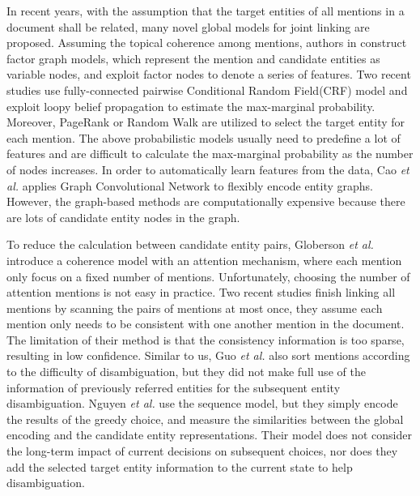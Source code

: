 \documentclass[sigconf]{acmart}
\begin{document}
In recent years, with the assumption that the target entities of all mentions in a document shall be related, many novel global models for joint linking are proposed. Assuming the topical coherence among mentions, authors in \cite{GaneaGLEH16, RanSW18} construct factor graph models, which represent the mention and candidate entities as variable nodes, and exploit factor nodes to denote a series of features. Two recent studies \cite{GaneaH17, TitovL18a} use fully-connected pairwise Conditional Random Field(CRF) model and exploit loopy belief propagation to estimate the max-marginal probability. Moreover, PageRank or Random Walk \cite{HanSZ11, GuoB18, ZwicklbauerSG16} are utilized to select the target entity for each mention. The above probabilistic models usually need to predefine a lot of features and are difficult to calculate the max-marginal probability as the number of nodes increases. In order to automatically learn features from the data, Cao \emph{et al.} \cite{0002HLL18} applies Graph Convolutional Network to flexibly encode entity graphs. However, the graph-based methods are computationally expensive because there are lots of candidate entity nodes in the graph.

To reduce the calculation between candidate entity pairs, Globerson \emph{et al.} \cite{GlobersonLCSRP16} introduce a coherence model with an attention mechanism, where each mention only focus on a fixed number of mentions. Unfortunately, choosing the number of attention mentions is not easy in practice. Two recent studies \cite{PhanSTHL17, abs-1802-01074} finish linking all mentions by scanning the pairs of mentions at most once, they assume each mention only needs to be consistent with one another mention in the document. The limitation of their method is that the consistency information is too sparse, resulting in low confidence. Similar to us, Guo \emph{et al.} \cite{GuoB18} also sort mentions according to the difficulty of disambiguation, but they did not make full use of the information of previously referred entities for the subsequent entity disambiguation. Nguyen \emph{et al.} \cite{NguyenFRHGS16} use the sequence model, but they simply encode the results of the greedy choice, and measure the similarities between the global encoding and the candidate entity representations. Their model does not consider the long-term impact of current decisions on subsequent choices, nor does they add the selected target entity information to the current state to help disambiguation.
\end{document}
